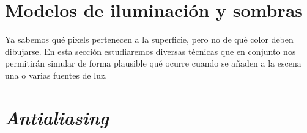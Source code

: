 \section{Modelos de iluminación y sombras}\label{sec:ilum}
Ya sabemos qué pixels pertenecen a la superficie, pero no de qué color deben dibujarse. En esta sección estudiaremos diversas técnicas que en conjunto nos permitirán simular de forma plausible qué ocurre cuando se añaden a la escena una o varias fuentes de luz.






\section{\textit{Antialiasing}}\label{sec:aa}
